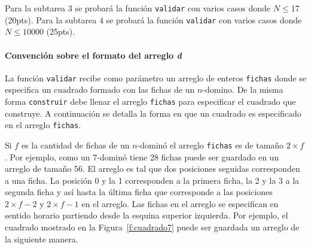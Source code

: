\documentclass{oci}
\begin{document}
Para la subtarea 3 se probará la función \verb+validar+ con varios casos donde $N\leq 17$ (20pts).
Para la subtarea 4 se probará la función \verb+validar+ con varios casos donde $N\leq 10000$ (25pts).

\paragraph{Convención sobre el formato del arreglo \emph{d}}
La función \verb+validar+ recibe como parámetro un arreglo de enteros \verb+fichas+ donde se especifica un cuadrado formado con las fichas de un $n$-domino.
De la misma forma \verb+construir+ debe llenar el arreglo \verb+fichas+ para especificar el cuadrado que construye.
A continuación se detalla la forma en que un cuadrado es especificado en el arreglo \verb+fichas+.

Si $f$ es la cantidad de fichas de un $n$-dominó el arreglo \verb+fichas+ es de tamaño $2\times f$.
Por ejemplo, como un $7$-dominó tiene 28 fichas puede ser guardado en un arreglo de tamaño 56.
El arreglo es tal que dos posiciones seguidas corresponden a una ficha.
La posición 0 y la 1 corresponden a la primera ficha, la 2 y la 3 a la segunda ficha y así hasta la última ficha que corresponde a las posiciones $2\times f-2$ y $2\times f-1$ en el arreglo.
Las fichas en el arreglo se especifican en sentido horario partiendo desde la esquina superior izquierda.
Por ejemplo, el cuadrado mostrado en la Figura~\ref{f:cuadrado7} puede ser guardada un arreglo de la siguiente manera.
\end{document}
